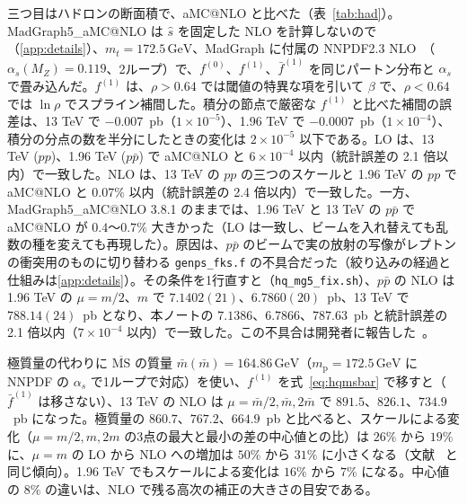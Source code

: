 \documentclass[a4paper,10pt]{ltjsarticle}
\newcommand{\MSbar}{\overline{\mathrm{MS}}}
\begin{document}
三つ目はハドロンの断面積で、aMC@NLO と比べた（表~\ref{tab:had}）。MadGraph5\_aMC@NLO は $\hat s$ を固定した NLO を計算しないので（\ref{app:details}）、$m_t=172.5\,\mathrm{GeV}$、MadGraph に付属の NNPDF2.3 NLO~\cite{nnpdf23qed}（$\alpha_s(M_Z)=0.119$、2ループ）で、$f^{(0)}$、$f^{(1)}$、$\bar f^{(1)}$ を同じパートン分布と $\alpha_s$ で畳み込んだ。$f^{(1)}$ は、$\rho>0.64$ では閾値の特異な項を引いて $\beta$ で、$\rho<0.64$ では $\ln\rho$ でスプライン補間した。積分の節点で厳密な $f^{(1)}$ と比べた補間の誤差は、13 TeV で $-0.007$~pb（$1\times10^{-5}$）、1.96 TeV で $-0.0007$~pb（$1\times10^{-4}$）、積分の分点の数を半分にしたときの変化は $2\times10^{-5}$ 以下である。LO は、13 TeV ($pp$)、1.96 TeV ($p\bar p$) で aMC@NLO と $6\times10^{-4}$ 以内（統計誤差の 2.1 倍以内）で一致した。NLO は、13 TeV の $pp$ の三つのスケールと 1.96 TeV の $pp$ で aMC@NLO と $0.07\%$ 以内（統計誤差の 2.4 倍以内）で一致した。一方、MadGraph5\_aMC@NLO 3.8.1 のままでは、1.96 TeV と 13 TeV の $p\bar p$ で aMC@NLO が $0.4$〜$0.7\%$ 大きかった（LO は一致し、ビームを入れ替えても乱数の種を変えても再現した）。原因は、$p\bar p$ のビームで実の放射の写像がレプトンの衝突用のものに切り替わる \texttt{genps\_fks.f} の不具合だった（絞り込みの経過と仕組みは\ref{app:details}）。その条件を1行直すと（\texttt{hq\_mg5\_fix.sh}）、$p\bar p$ の NLO は 1.96 TeV の $\mu=m/2$、$m$ で $7.1402(21)$、$6.7860(20)$~pb、13 TeV で $788.14(24)$~pb となり、本ノートの $7.1386$、$6.7866$、$787.63$~pb と統計誤差の 2.1 倍以内（$7\times10^{-4}$ 以内）で一致した。この不具合は開発者に報告した~\cite{mg5issue}。

極質量の代わりに $\MSbar$ の質量 $\bar m(\bar m)=164.86\,\mathrm{GeV}$（$m_{\mathrm p}=172.5\,\mathrm{GeV}$ に NNPDF の $\alpha_s$ で1ループで対応）を使い、$f^{(1)}$ を式~\eqref{eq:hqmsbar} で移すと（$\bar f^{(1)}$ は移さない）、13 TeV の NLO は $\mu=\bar m/2,\bar m,2\bar m$ で $891.5$、$826.1$、$734.9$~pb になった。極質量の $860.7$、$767.2$、$664.9$~pb と比べると、スケールによる変化（$\mu=m/2,m,2m$ の3点の最大と最小の差の中心値との比）は $26\%$ から $19\%$ に、$\mu=m$ の LO から NLO への増加は $50\%$ から $31\%$ に小さくなる（文献~\cite{lmu09} と同じ傾向）。1.96 TeV でもスケールによる変化は $16\%$ から $7\%$ になる。中心値の $8\%$ の違いは、NLO で残る高次の補正の大きさの目安である。
\end{document}

